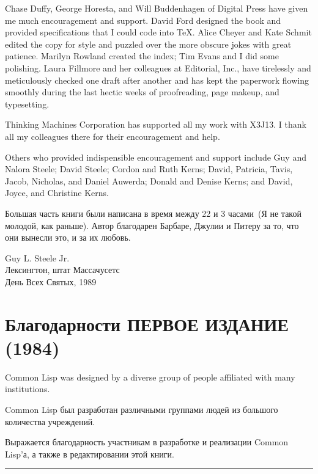 Chase Duffy, George Horesta, and Will Buddenhagen of Digital Press have given me
much encouragement and support.  David Ford designed the book and
provided specifications that I could code into \TeX.
Alice Cheyer and Kate Schmit edited the copy for style
and puzzled over the more obscure jokes with great patience.
Marilyn Rowland created the index; Tim Evans and I did some polishing.
Laura Fillmore and her colleagues at Editorial, Inc., have
tirelessly and meticulously checked one draft after another and
has kept the paperwork flowing smoothly during the last hectic weeks
of proofreading, page makeup, and typesetting.

Thinking Machines Corporation has supported all my work with X3J13.
I thank all my colleagues there for their encouragement and help.

Others who provided indispensible encouragement and support include
Guy and Nalora Steele; David Steele; Cordon and Ruth Kerns;
David, Patricia, Tavis, Jacob, Nicholas, and Daniel Auwerda;
Donald and Denise Kerns; and David, Joyce, and Christine Kerns.

Большая часть книги были написана в время между 22 и 3 часами~(Я не такой
молодой, как раньше). Автор благодарен Барбаре, Джулии и Питеру за то, что они
вынесли это, и за их любовь.

\begin{tabbing}
Guy L. Steele Jr. \\
Лексингтон, штат Массачусетс \\
День Всех Святых, 1989
\end{tabbing}

\chapter*{Благодарности ПЕРВОЕ ИЗДАНИЕ (1984)}

Common Lisp was designed
by a diverse group of people affiliated with many institutions.

Common Lisp был разработан различными группами людей из большого количества учреждений.


Выражается благодарность участникам в разработке и реализации Common Lisp'а, а
также в редактировании этой книги.
\hrule width 0pt\relax

